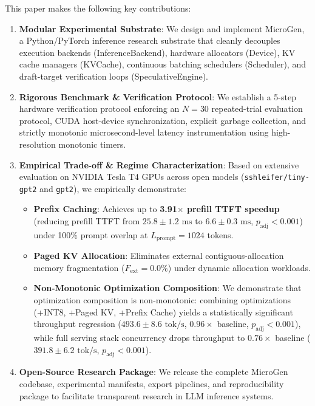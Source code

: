 This paper makes the following key contributions:
\begin{enumerate}
    \item \textbf{Modular Experimental Substrate}: We design and implement \textsf{MicroGen}, a Python/PyTorch inference research substrate that cleanly decouples execution backends (\textsf{InferenceBackend}), hardware allocators (\textsf{Device}), KV cache managers (\textsf{KVCache}), continuous batching schedulers (\textsf{Scheduler}), and draft-target verification loops (\textsf{SpeculativeEngine}).
    \item \textbf{Rigorous Benchmark \& Verification Protocol}: We establish a 5-step hardware verification protocol enforcing an $N=30$ repeated-trial evaluation protocol, CUDA host-device synchronization, explicit garbage collection, and strictly monotonic microsecond-level latency instrumentation using high-resolution monotonic timers.
    \item \textbf{Empirical Trade-off \& Regime Characterization}: Based on extensive evaluation on NVIDIA Tesla T4 GPUs across open models (\texttt{sshleifer/tiny-gpt2} and \texttt{gpt2}), we empirically demonstrate:
    \begin{itemize}
        \item \textbf{Prefix Caching}: Achieves up to \textbf{3.91$\times$ prefill TTFT speedup} (reducing prefill TTFT from $25.8 \pm 1.2\text{ ms}$ to $6.6 \pm 0.3\text{ ms}$, $p_{\text{adj}} < 0.001$) under 100\% prompt overlap at $L_{\text{prompt}}=1024$ tokens.
        \item \textbf{Paged KV Allocation}: Eliminates external contiguous-allocation memory fragmentation ($F_{\text{ext}} = 0.0\%$) under dynamic allocation workloads.
        \item \textbf{Non-Monotonic Optimization Composition}: We demonstrate that optimization composition is non-monotonic: combining optimizations (+INT8, +Paged KV, +Prefix Cache) yields a statistically significant throughput regression ($493.6 \pm 8.6\text{ tok/s}$, $0.96\times$ baseline, $p_{\text{adj}} < 0.001$), while full serving stack concurrency drops throughput to $0.76\times$ baseline ($391.8 \pm 6.2\text{ tok/s}$, $p_{\text{adj}} < 0.001$).
    \end{itemize}
    \item \textbf{Open-Source Research Package}: We release the complete \textsf{MicroGen} codebase, experimental manifests, export pipelines, and reproducibility package to facilitate transparent research in LLM inference systems.
\end{enumerate}


